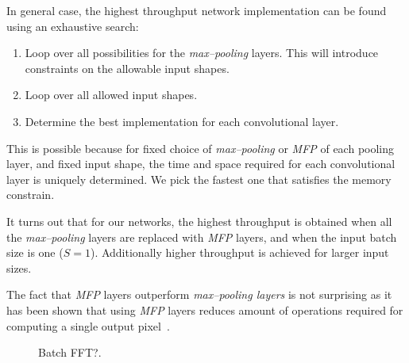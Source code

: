 \documentclass[conference]{./IEEEtran/IEEEtran}
\begin{document}
  In general case, the highest throughput network implementation can
  be found using an exhaustive search:

  \begin{enumerate}
    \item Loop over all possibilities for the \emph{max--pooling}
      layers.  This will introduce constraints on the allowable input
      shapes.
    \item Loop over all allowed input shapes.
    \item Determine the best implementation for each convolutional
      layer.
  \end{enumerate}

  This is possible because for fixed choice of \emph{max--pooling} or
  \emph{MFP} of each pooling layer, and fixed input shape, the time
  and space required for each convolutional layer is uniquely
  determined.  We pick the fastest one that satisfies the memory
  constrain.

  It turns out that for our networks, the highest throughput is
  obtained when all the \emph{max--pooling} layers are replaced with
  \emph{MFP} layers, and when the input batch size is one
  ($S = 1$).  Additionally higher throughput is achieved for larger input
  sizes.

  The fact that \emph{MFP} layers outperform \emph{max--pooling
    layers} is not surprising as it has been shown that using
  \emph{MFP} layers reduces amount of operations required for
  computing a single output pixel~\cite{giusti2013fast,masci2013fast}.


  \begin{figure}
    \centering
    \caption{Batch FFT?.}
    \label{fig:fftbatch}
  \end{figure}
\end{document}
